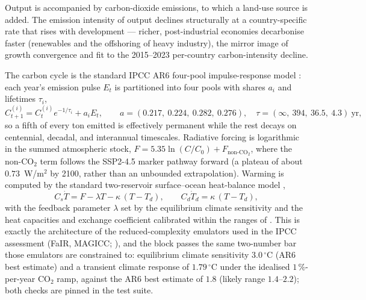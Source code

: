 \documentclass[a4paper,fleqn]{cas-sc}
\begin{document}
Output is accompanied by carbon-dioxide emissions, to which a land-use source is added. The emission
intensity of output declines structurally at a country-specific rate that rises with development ---
richer, post-industrial economies decarbonise faster (renewables and the offshoring of heavy
industry), the mirror image of growth convergence and fit to the 2015--2023 per-country
carbon-intensity decline.

The carbon cycle is the standard IPCC AR6 four-pool impulse-response model
\citep{joos2013}: each year's emission pulse $E_t$ is partitioned into four pools with shares
$a_i$ and lifetimes $\tau_i$,
\begin{equation}
C^{(i)}_{t+1} = C^{(i)}_t e^{-1/\tau_i} + a_i E_t, \qquad
a = (0.217,\ 0.224,\ 0.282,\ 0.276), \quad
\tau = (\infty,\ 394,\ 36.5,\ 4.3)\ \text{yr},
\label{eq:pools}
\end{equation}
so a fifth of every ton emitted is effectively permanent while the rest decays on centennial,
decadal, and interannual timescales. Radiative forcing is logarithmic in the summed atmospheric
stock, $F = 5.35 \ln (C/C_0) + F_{\mathrm{non\text{-}CO_2}}$, where the non-CO$_2$ term follows
the SSP2-4.5 marker pathway forward (a plateau of about $0.73$~W/m$^2$ by 2100, rather than an
unbounded extrapolation). Warming is computed by the standard two-reservoir surface--ocean
heat-balance model \citep{geoffroy2013},
\begin{equation}
C_s \dot T = F - \lambda T - \kappa\,(T - T_d), \qquad
C_d \dot T_d = \kappa\,(T - T_d),
\label{eq:ebm}
\end{equation}
with the feedback parameter $\lambda$ set by the equilibrium climate sensitivity and the heat
capacities and exchange coefficient calibrated within the ranges of \citet{geoffroy2013}. This is
exactly the architecture of the reduced-complexity emulators used in the IPCC assessment (FaIR,
MAGICC; \citealp{smith2018fair,meinshausen2011}), and the block passes the same two-number bar
those emulators are constrained to: equilibrium climate sensitivity $3.0\,^\circ$C (AR6 best
estimate) and a transient climate response of $1.79\,^\circ$C under the idealised $1\,\%$-per-year
CO$_2$ ramp, against the AR6 best estimate of $1.8$ (likely range $1.4$--$2.2$); both checks are
pinned in the test suite.
\end{document}
